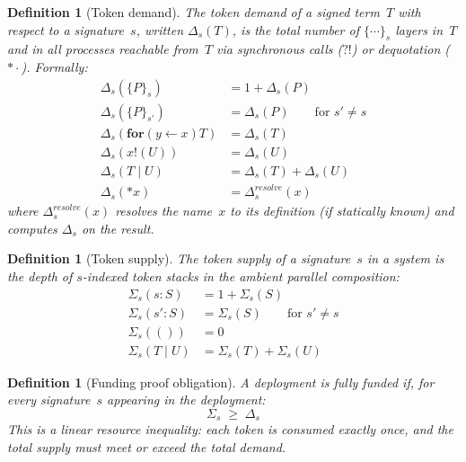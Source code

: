 \documentclass[11pt,a4paper]{article}
\newtheorem{definition}[theorem]{Definition}
\newcommand{\Par}{\mathbin{|}}
\newcommand{\forc}{\mathbf{for}}
\newcommand{\send}[2]{#1 !\!\left( #2 \right)}
\newcommand{\recv}[3]{\forc\!\left( #1 \leftarrow #2 \right) #3}
\newcommand{\drop}[1]{{\ast} #1}
\newcommand{\signed}[2]{\{#1\}_{#2}}
\begin{document}
\begin{definition}[Token demand]
  \label{def:token-demand}
  The \emph{token demand} of a signed term~$T$ with respect
  to a signature~$s$, written $\Delta_s(T)$, is the total
  number of $\signed{\cdots}{s}$ layers in~$T$ and in all
  processes reachable from~$T$ via synchronous calls ($?!$)
  or dequotation ($\drop{\cdot}$).  Formally:
  \begin{align*}
    \Delta_s(\signed{P}{s})
      &= 1 + \Delta_s(P) \\
    \Delta_s(\signed{P}{s'})
      &= \Delta_s(P)
      \qquad\text{for } s' \neq s \\
    \Delta_s(\recv{y}{x}{T})
      &= \Delta_s(T) \\
    \Delta_s(\send{x}{U})
      &= \Delta_s(U) \\
    \Delta_s(T \Par U)
      &= \Delta_s(T) + \Delta_s(U) \\
    \Delta_s(\drop{x})
      &= \Delta_s^{\mathit{resolve}}(x)
  \end{align*}
  where $\Delta_s^{\mathit{resolve}}(x)$ resolves the
  name~$x$ to its definition (if statically known) and
  computes $\Delta_s$ on the result.
\end{definition}

\begin{definition}[Token supply]
  \label{def:token-supply}
  The \emph{token supply} of a signature~$s$ in a system is
  the depth of $s$-indexed token stacks in the ambient
  parallel composition:
  \begin{align*}
    \Sigma_s(s : S)
      &= 1 + \Sigma_s(S) \\
    \Sigma_s(s' : S)
      &= \Sigma_s(S)
      \qquad\text{for } s' \neq s \\
    \Sigma_s(())
      &= 0 \\
    \Sigma_s(T \Par U)
      &= \Sigma_s(T) + \Sigma_s(U)
  \end{align*}
\end{definition}

\begin{definition}[Funding proof obligation]
  \label{def:funding-proof}
  A deployment is \emph{fully funded} if, for every
  signature~$s$ appearing in the deployment:
  \begin{equation}
    \Sigma_s \;\geq\; \Delta_s
    \label{eq:funding-obligation}
  \end{equation}
  This is a \emph{linear resource inequality}: each token is
  consumed exactly once, and the total supply must meet or
  exceed the total demand.
\end{definition}
\end{document}

